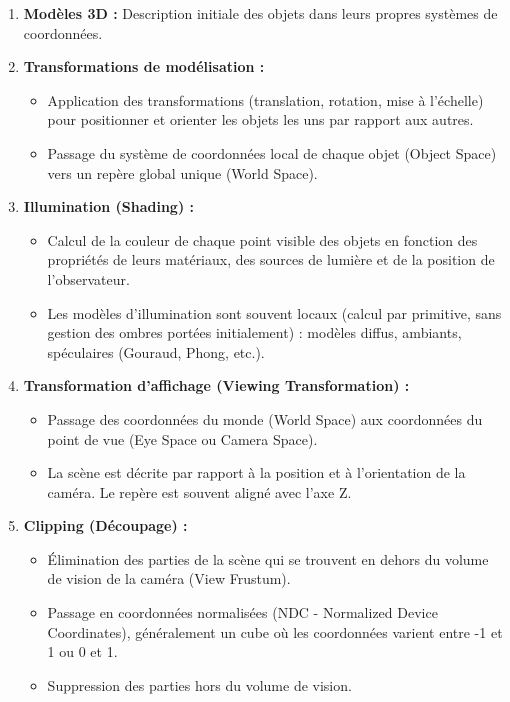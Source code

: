 \documentclass{article}
\begin{document}
\begin{enumerate}
    \item \textbf{Modèles 3D :} Description initiale des objets dans leurs propres systèmes de coordonnées.
    \item \textbf{Transformations de modélisation :}
    \begin{itemize}
        \item Application des transformations (translation, rotation, mise à l'échelle) pour positionner et orienter les objets les uns par rapport aux autres.
        \item Passage du système de coordonnées local de chaque objet (Object Space) vers un repère global unique (World Space).
    \end{itemize}
    \item \textbf{Illumination (Shading) :}
    \begin{itemize}
        \item Calcul de la couleur de chaque point visible des objets en fonction des propriétés de leurs matériaux, des sources de lumière et de la position de l'observateur.
        \item Les modèles d'illumination sont souvent locaux (calcul par primitive, sans gestion des ombres portées initialement) : modèles diffus, ambiants, spéculaires (Gouraud, Phong, etc.).
    \end{itemize}
    \item \textbf{Transformation d'affichage (Viewing Transformation) :}
    \begin{itemize}
        \item Passage des coordonnées du monde (World Space) aux coordonnées du point de vue (Eye Space ou Camera Space).
        \item La scène est décrite par rapport à la position et à l'orientation de la caméra. Le repère est souvent aligné avec l'axe Z.
    \end{itemize}
    \item \textbf{Clipping (Découpage) :}
    \begin{itemize}
        \item Élimination des parties de la scène qui se trouvent en dehors du volume de vision de la caméra (View Frustum).
        \item Passage en coordonnées normalisées (NDC - Normalized Device Coordinates), généralement un cube où les coordonnées varient entre -1 et 1 ou 0 et 1.
        \item Suppression des parties hors du volume de vision.

\end{itemize}
\end{enumerate}
\end{document}
